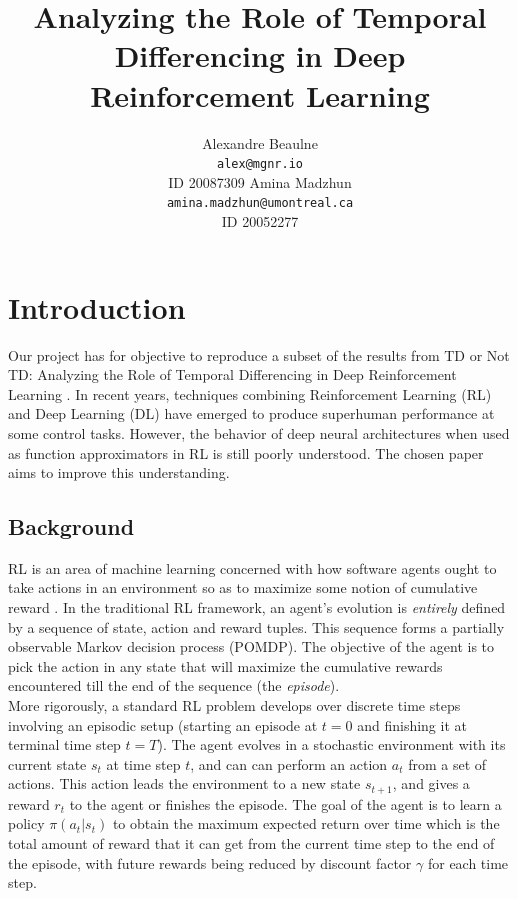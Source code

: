 \documentclass{article}
\title{Analyzing the Role of Temporal Differencing in Deep Reinforcement Learning}
\author{
  Alexandre Beaulne \\
  \texttt{alex@mgnr.io} \\
  ID 20087309
  \And
  Amina Madzhun \\
  \texttt{amina.madzhun@umontreal.ca} \\
  ID 20052277
}
\begin{document}
\maketitle
\section{Introduction}

Our project has for objective to reproduce a subset of
the results from TD or Not TD: Analyzing the Role of Temporal
Differencing in Deep Reinforcement Learning \citep{amiranashvili2018analyzing}.
In recent years, techniques combining Reinforcement Learning (RL)
and Deep Learning (DL) have emerged \citep{mnih2015} to produce
superhuman performance at some control tasks. However, the behavior
of deep neural architectures when used as function approximators
in RL is still poorly understood. The chosen paper aims to improve
this understanding.

\subsection*{Background}

RL is an area of machine learning concerned with how software agents
ought to take actions in an environment so as to maximize some notion
of cumulative reward \citep{suttonbarto2018}. In the traditional RL
framework, an agent's evolution is \emph{entirely} defined by a sequence
of state, action and reward tuples. This sequence forms a
partially observable Markov decision process (POMDP). The objective
of the agent is to pick the action in any state that will
maximize the cumulative rewards encountered till the end of the
sequence (the \emph{episode}).\\

More rigorously, a standard RL problem develops over discrete
time steps involving an episodic setup (starting an episode at
$t=0$ and finishing it at terminal time step $t=T$).
The agent evolves in a stochastic environment with its current state
$s_t$ at time step $t$, and can can perform an action $a_t$ from a
set of actions. This action leads the environment to a new state
$s_{t + 1}$, and gives a reward $r_t$ to the agent or finishes the episode.
The goal of the agent is to learn a policy $\pi(a_t|s_t)$
to obtain the maximum expected return over time which is
the total amount of reward that it can get from the current time step
to the end of the episode, with future rewards being reduced by discount
factor $\gamma$ for each time step. \\
\end{document}
